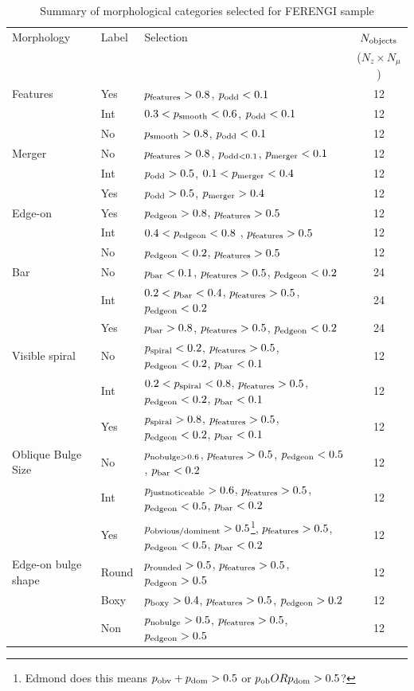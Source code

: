 \documentclass[usenatbib]{mn2e}
\begin{document}
\begin{table}
\caption{Summary of morphological categories selected for FERENGI sample \label{morphologies}}
\begin{tabular}{lllc}
\hline\hline
Morphology & Label &  Selection & $N_{\rm objects}$ \\
 & & & ($N_z \times N_\mu$) \\
\hline
Features & Yes & $p_{\rm features} > 0.8$, $p_{\rm odd} < 0.1$ & 12 \\ 
 & Int & $0.3 < p_{\rm smooth} < 0.6$, $p_{\rm odd} < 0.1$ & 12 \\ 
 & No &  $p_{\rm smooth} > 0.8$, $p_{\rm odd} < 0.1$ & 12 \\ 
Merger & No & $p_{\rm features} > 0.8$, $p_{\rm odd < 0.1}$, $p_{\rm merger} < 0.1$ & 12\\
& Int & $p_{\rm odd} > 0.5$, $0.1< p_{\rm merger} < 0.4$ & 12 \\ 
& Yes & $p_{\rm odd} > 0.5$, $p_{\rm merger} > 0.4$ & 12\\
Edge-on & Yes &  $p_{\rm edgeon} > 0.8$, $p_{\rm features} > 0.5$ & 12 \\
& Int & $0.4 < p_{\rm edgeon} < 0.8$ , $p_{\rm features} > 0.5$ & 12 \\
& No & $p_{\rm edgeon} < 0.2$, $p_{\rm features} > 0.5$ & 12 \\
Bar & No & $p_{\rm bar} < 0.1$, $p_{\rm features} > 0.5$, $p_{\rm edgeon} < 0.2$ & 24 \\
& Int & $0.2 < p_{\rm bar} < 0.4$, $p_{\rm features} > 0.5$, $p_{\rm edgeon} < 0.2$ & 24 \\
& Yes&  $p_{\rm bar} > 0.8$, $p_{\rm features} > 0.5$, $p_{\rm edgeon} < 0.2$ & 24 \\
Visible spiral & No & $p_{\rm spiral} < 0.2$, $p_{\rm features} > 0.5$, $p_{\rm edgeon} < 0.2$, $p_{\rm bar} < 0.1$ & 12 \\
& Int &  $0.2 < p_{\rm spiral} < 0.8$, $p_{\rm features} > 0.5$, $p_{\rm edgeon} < 0.2$, $p_{\rm bar} < 0.1$ & 12 \\
& Yes &  $p_{\rm spiral} > 0.8$, $p_{\rm features} > 0.5$, $p_{\rm edgeon} < 0.2$, $p_{\rm bar} < 0.1$ & 12 \\
Oblique Bulge Size & No & $p_{\rm nobulge>0.6}$, $p_{\rm features} > 0.5$, $p_{\rm edgeon} < 0.5$, $p_{\rm bar} < 0.2$ & 12 \\
& Int &  $p_{\rm justnoticeable}>0.6$, $p_{\rm features} > 0.5$, $p_{\rm edgeon} < 0.5$, $p_{\rm bar} < 0.2$ & 12 \\
& Yes & $p_{\rm obvious/dominent}>0.5$\footnote{Edmond does this means $p_{\rm obv}+p_{\rm dom}>0.5$ or $p_{\rm ob} OR p_{\rm dom} >0.5$? }, $p_{\rm features} > 0.5$, $p_{\rm edgeon} < 0.5$, $p_{\rm bar} < 0.2$ & 12 \\
Edge-on bulge shape 
& Round & $p_{\rm rounded}>0.5$, $p_{\rm features} > 0.5$, $p_{\rm edgeon} > 0.5$ & 12\\
& Boxy & $p_{\rm boxy}>0.4$, $p_{\rm features} > 0.5$, $p_{\rm edgeon} > 0.2$ & 12\\
& Non & $p_{\rm nobulge}>0.5$, $p_{\rm features} > 0.5$, $p_{\rm edgeon} > 0.5$ & 12\\
\hline\hline
\end{tabular}
\end{table}
\end{document}
